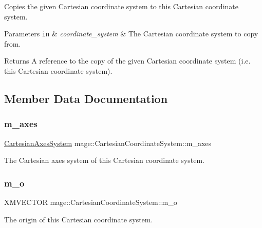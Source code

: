 Copies the given Cartesian coordinate system to this Cartesian coordinate system.


\begin{DoxyParams}[1]{Parameters}
\mbox{\tt in}  & {\em coordinate\+\_\+system} & The Cartesian coordinate system to copy from. \\
\hline
\end{DoxyParams}
\begin{DoxyReturn}{Returns}
A reference to the copy of the given Cartesian coordinate system (i.\+e. this Cartesian coordinate system). 
\end{DoxyReturn}


\subsection{Member Data Documentation}
\hypertarget{structmage_1_1_cartesian_coordinate_system_acf7b8cf35026f5fa8fc11a126b96b055}{}\label{structmage_1_1_cartesian_coordinate_system_acf7b8cf35026f5fa8fc11a126b96b055} 
\subsubsection{\texorpdfstring{m\+\_\+axes}{m\_axes}}
{\footnotesize\ttfamily \hyperlink{structmage_1_1_cartesian_axes_system}{Cartesian\+Axes\+System} mage\+::\+Cartesian\+Coordinate\+System\+::m\+\_\+axes\hspace{0.3cm}{\ttfamily [private]}}

The Cartesian axes system of this Cartesian coordinate system. \hypertarget{structmage_1_1_cartesian_coordinate_system_a1ea373bb91be991ee221a2ce1e02be2b}{}\label{structmage_1_1_cartesian_coordinate_system_a1ea373bb91be991ee221a2ce1e02be2b} 
\subsubsection{\texorpdfstring{m\+\_\+o}{m\_o}}
{\footnotesize\ttfamily X\+M\+V\+E\+C\+T\+OR mage\+::\+Cartesian\+Coordinate\+System\+::m\+\_\+o\hspace{0.3cm}{\ttfamily [private]}}

The origin of this Cartesian coordinate system. 